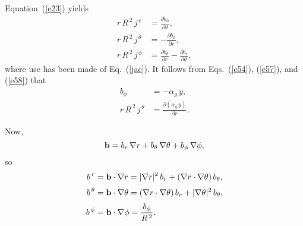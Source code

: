 \documentclass[12pt,prb,aps,notitlepage]{revtex4-1}
\begin{document}
Equation~(\ref{e23}) yields 
\begin{align}
r\,R^{\,2}\,j^{\,r} &= \frac{\partial b_\phi}{\partial\theta},\label{e57}\\[0.5ex]
r\,R^{\,2}\,j^{\,\theta} &= -\frac{\partial b_\phi}{\partial r},\label{e58}\\[0.5ex]
r\,R^{\,2}\,j^{\,\phi}&= \frac{\partial b_\theta}{\partial r} -\frac{\partial b_r}{\partial \theta},\label{e59}
\end{align}
where use has been made of Eq.~(\ref{jac}). It follows from Eqs.~(\ref{e54}), (\ref{e57}), and (\ref{e58}) that
\begin{align}\label{e43yy}
b_\phi &=-\alpha_g\,y,\\[0.5ex]
r\,R^{\,2}\,j^{\,\theta}&=  \frac{\partial (\alpha_g\,y)}{\partial r}.\label{e44yy}
\end{align}

Now, 
\begin{equation}
{\bf b} = b_r\,\nabla r + b_\theta\,\nabla\theta+b_\phi\,\nabla\phi,
\end{equation}
so
\begin{align}
b^{\,r} &= {\bf b}\cdot\nabla r = |\nabla r|^2\,b_r + (\nabla r\cdot\nabla\theta)\,b_\theta,\label{e61}\\[0.5ex]
b^{\,\theta} &= {\bf b}\cdot\nabla \theta = (\nabla r\cdot\nabla\theta)\,b_r + |\nabla\theta|^2\,b_\theta,\label{e62}\\[0.5ex]
b^{\,\phi}&={\bf b}\cdot\nabla\phi =\frac{b_\phi}{R^{\,2}}.\label{e63}
\end{align}
\end{document}
